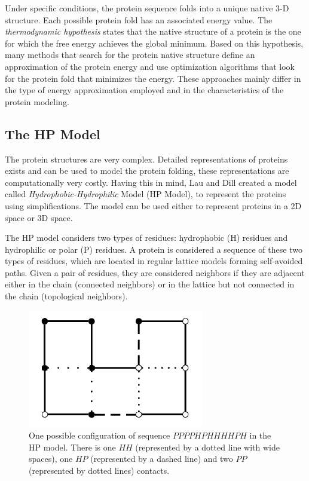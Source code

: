 \documentclass[conference]{IEEEtran}
\begin{document}

Under specific conditions, the protein sequence folds into a unique native 3-D structure. Each possible protein fold has an associated energy value. The \emph{thermodynamic hypothesis} states that the native structure of a protein is the one for which the free energy achieves the global minimum. Based on this hypothesis, many methods \cite{custodio2004investigation, hsu2003growth, krasnogor2002multimeme, lin2011protein, unger1993genetic} that search for the protein native structure define an approximation of the protein energy and use optimization algorithms that look for the protein fold that minimizes the energy. These approaches mainly differ in the type of energy approximation employed and in the characteristics of the protein modeling.


\subsection{The HP Model} \label{sec:hpModel}


The protein structures are very complex. Detailed representations of proteins exists and can be used to model the protein folding, these representations are computationally very costly. Having this in mind, Lau and Dill \cite{lau1989lattice} created a model called \textit{Hydrophobic-Hydrophilic} Model (HP Model), to represent the proteins using simplifications. The model can be used either to represent proteins in a 2D space or 3D space.


The HP model considers two types of residues:  hydrophobic (H) residues  and hydrophilic or polar (P) residues. A protein is considered a sequence of these two types of residues, which are located in regular lattice models forming self-avoided paths. Given a pair of residues, they are considered neighbors if they are adjacent  either in the chain (connected neighbors) or  in the lattice but not connected in the chain (topological neighbors).


\begin{figure}[htb!] \label{fig:PROTEXAM}
	\centering
	\includegraphics[scale=0.7]{figures/proteinExample.png}
	\caption{One possible configuration of  sequence $PPPPHPHHHHPH$ in the HP model. There is one $HH$ (represented by a dotted line with wide spaces), one $HP$ (represented by a dashed line) and  two $PP$  (represented by dotted lines) contacts.}
\end{figure}
\end{document}
